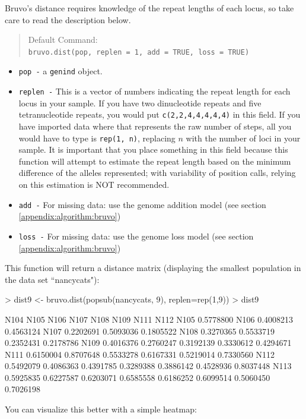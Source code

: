 \documentclass[letterpaper]{article}
\newcommand{\tab}{\hspace*{1em}}
\begin{document}
\tab\tab Bruvo's distance requires knowledge of the repeat lengths of each locus, so take care to read the description below.
\begin{quote}
Default Command:\\
\texttt{bruvo.dist(pop, replen = 1, add = TRUE, loss = TRUE)}
\end{quote}
\begin{itemize}
  \item \texttt{pop -} a \texttt{genind} object.
  \item \texttt{replen -} This is a vector of numbers indicating the repeat length for each locus in your sample. If you have two dinucleotide repeats and five tetranucleotide repeats, you would put \texttt{c(2,2,4,4,4,4,4)} in this field. If you have imported data where that represents the raw number of steps, all you would have to type is \texttt{rep(1, n)}, replacing $n$ with the number of loci in your sample. It is important that you place something in this field because this function will attempt to estimate the repeat length based on the minimum difference of the alleles represented; with variability of position calls, relying on this estimation is NOT recommended. 
  \item \texttt{add -} For missing data: use the genome addition model (see section \ref{appendix:algorithm:bruvo})
  \item \texttt{loss -} For missing data: use the genome loss model (see section \ref{appendix:algorithm:bruvo})
\end{itemize}
This function will return a distance matrix (displaying the smallest population in the data set ``nancycats"):
\begin{Schunk}
\begin{Sinput}
> dist9 <- bruvo.dist(popsub(nancycats, 9), replen=rep(1,9))
> dist9
\end{Sinput}
\begin{Soutput}
          N104      N105      N106      N107      N108      N109      N111      N112
N105 0.5778800                                                                      
N106 0.4008213 0.4563124                                                            
N107 0.2202691 0.5093036 0.1805522                                                  
N108 0.3270365 0.5533719 0.2352431 0.2178786                                        
N109 0.4016376 0.2760247 0.3192139 0.3330612 0.4294671                              
N111 0.6150004 0.8707648 0.5533278 0.6167331 0.5219014 0.7330560                    
N112 0.5492079 0.4086363 0.4391785 0.3289388 0.3886142 0.4528936 0.8037448          
N113 0.5925835 0.6227587 0.6203071 0.6585558 0.6186252 0.6099514 0.5060450 0.7026198
\end{Soutput}
\end{Schunk}
You can visualize this better with a simple heatmap:
\end{document}
